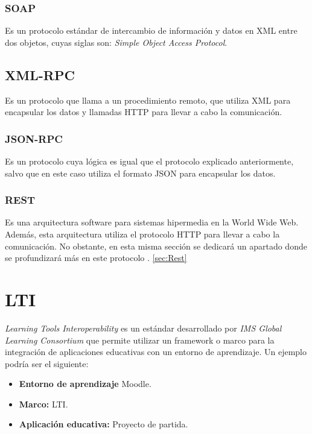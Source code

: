 \subsubsection{SOAP}

Es un protocolo estándar de intercambio de información y datos en XML entre dos objetos, cuyas siglas son: \emph{Simple Object Access Protocol}. \cite{wiki:soap} \cite{wiki:soap2}

\subsection{XML-RPC}

Es un protocolo que llama a un procedimiento remoto, que utiliza XML para encapsular los datos y llamadas HTTP para llevar a cabo la comunicación.

\subsubsection{JSON-RPC}

Es un protocolo cuya lógica es igual que el protocolo explicado anteriormente, salvo que en este caso utiliza el formato JSON para encapsular los datos.

\subsubsection{REST}

Es una arquitectura software para sistemas hipermedia en la World Wide Web. Además, esta arquitectura utiliza el protocolo HTTP para llevar a cabo la comunicación. No obstante, en esta misma sección se dedicará un apartado donde se profundizará más en este protocolo \cite{wiki:rest}. \ref{sec:Rest}


\section{LTI}\label{subsec:LTI}

\emph{Learning Tools Interoperability} es un estándar desarrollado por \emph{IMS Global Learning Consortium} que permite utilizar un framework o marco para la integración de aplicaciones educativas con un entorno de aprendizaje. \cite{wiki:lti}
Un ejemplo podría ser el siguiente:

\begin{itemize}
	\item \textbf{Entorno de aprendizaje} Moodle.
	\item \textbf{Marco:} LTI.
	\item \textbf{Aplicación educativa:} Proyecto de partida.
\end{itemize}

